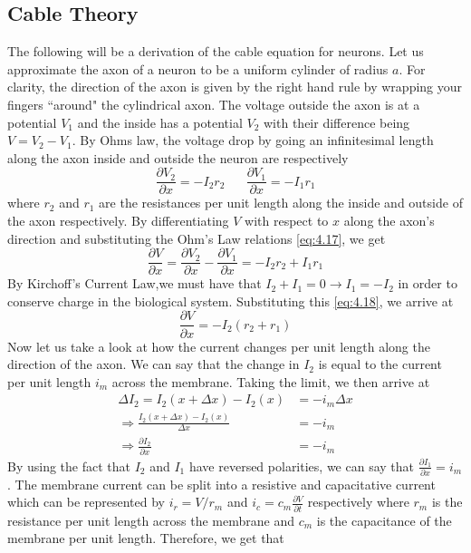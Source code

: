 \documentclass{article}
\newcommand{\pd}[2]{\frac{\partial #1}{\partial #2}}
\numberwithin{equation}{section}
\begin{document}
\subsection{Cable Theory}
The following will be a derivation of the cable equation for neurons. Let us approximate the axon of a neuron to be a uniform cylinder of radius $a$. For clarity, the direction of the axon is given by the right hand rule by wrapping your fingers ``around" the cylindrical axon. The voltage outside the axon is at a potential $V_1$ and the inside has a potential $V_2$ with their difference being $V=V_2-V_1$. By Ohms law, the voltage drop by going an infinitesimal length along the axon inside and outside the neuron are respectively 
\begin{equation}
    \pd{V_2}{x} = -I_2r_2 \hspace{20pt} \pd{V_1}{x} = -I_1r_1 \label{eq:4.17}
\end{equation}
where $r_2$ and $r_1$ are the resistances per unit length along the inside and outside of the axon respectively. By differentiating $V$ with respect to $x$ along the axon's direction and substituting the Ohm's Law relations \eqref{eq:4.17}, we get 
\begin{equation}
    \pd{V}{x} = \pd{V_2}{x} - \pd{V_1}{x} = -I_2r_2+I_1r_1 \label{eq:4.18}
\end{equation}
By Kirchoff's Current Law,we must have that $I_2+I_1=0 \rightarrow I_1=-I_2$ in order to conserve charge in the biological system. Substituting this \eqref{eq:4.18}, we arrive at 
\begin{equation}
    \pd{V}{x} = -I_2 (r_2+r_1) \label{eq:4.19}
\end{equation}
Now let us take a look at how the current changes per unit length along the direction of the axon. We can say that the change in $I_2$ is equal to the current per unit length $i_m$ across the membrane. Taking the limit, we then arrive at  
\begin{equation*}
\begin{split}
    \Delta I_2 = I_2(x+\Delta x) - I_2(x) &=-i_m \Delta x \\
    \Rightarrow \frac{I_2(x+\Delta x) - I_2(x)}{\Delta x} &=-i_m\\
    \Rightarrow \pd{I_2}{x} &=-i_m
\end{split}
\end{equation*}
By using the fact that $I_2$ and $I_1$ have reversed polarities, we can say that $\pd{I_1}{x} =i_m$. The membrane current can be split into a resistive and capacitative current which can be represented by $i_r = V/r_m$ and $i_c = c_m\pd{V}{t}$ respectively where $r_m$ is the resistance per unit length across the membrane and $c_m$ is the capacitance of the membrane per unit length. Therefore, we get that 
\end{document}
